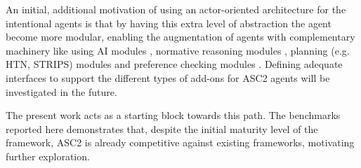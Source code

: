 An initial, additional motivation of using an actor-oriented architecture for the intentional agents is that by having this extra level of abstraction the agent become more modular, enabling the augmentation of agents with complementary machinery like using AI modules \cite{Singh2011IntegratingLI}, normative reasoning modules \cite{meneguzzi2009norm}, planning (e.g. HTN, STRIPS) modules \cite{meneguzzi_de_silva_2015} and preference checking modules \cite{Visser2016,Mohajeri2019}. Defining  adequate interfaces to support the different types of add-ons for ASC2 agents will be investigated in the future.

The present work acts as a starting block towards this path. The benchmarks reported here demonstrates that, despite the initial maturity level of the framework, ASC2 is already competitive against existing frameworks, motivating further exploration.


 
